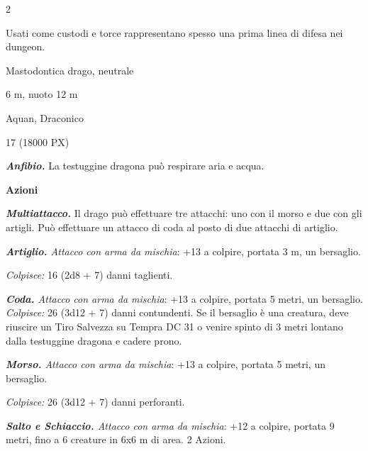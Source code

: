\begin{multicols}{2}
{Usati come custodi e torce rappresentano spesso una prima linea di difesa nei dungeon.

\begin{description}[noitemsep, topsep=0pt, parsep=0pt, partopsep=0pt, itemsep=1pt, leftmargin=2.35cm,  labelwidth=2.2cm, itemindent=0cm, listparindent=0pt] %
\setlength{\baselineskip}{10pt}
\item[\textbf{Taglia/Tipo}] Mastodontica drago, neutrale
\item[\textbf{Caratt.}] 
\item[\textbf{Punti Ferita}] 
\item[\textbf{Movimento}] 6 m, nuoto 12 m
\item[\textbf{Tiri Salvez.}] 
\item[\textbf{Sensi}] 
\item[\textbf{Linguaggi}] Aquan, Draconico
\item[\textbf{Sfida}] 17 (18000 PX)
\end{description}
\smallskip

\emph{\textbf{Anfibio.}} La testuggine dragona può respirare aria e acqua.

\textbf{Azioni}

\emph{\textbf{Multiattacco.}} Il drago può effettuare tre attacchi: uno con il morso e due con gli artigli. Può effettuare un attacco di coda al posto di due attacchi di artiglio.

\emph{\textbf{Artiglio.} Attacco con arma da mischia}: +13 a colpire, portata 3 m, un bersaglio.

\emph{Colpisce:} 16 (2d8 + 7) danni taglienti.

\emph{\textbf{Coda.} Attacco con arma da mischia}: +13 a colpire, portata 5 metri, un bersaglio.
\emph{Colpisce:} 26 (3d12 + 7) danni contundenti. Se il bersaglio è una creatura, deve riuscire un Tiro Salvezza su Tempra DC 31 o venire spinto di 3 metri lontano dalla testuggine dragona e cadere prono.

\emph{\textbf{Morso.} Attacco con arma da mischia}: +13 a colpire, portata 5 metri, un bersaglio.

\emph{Colpisce:} 26 (3d12 + 7) danni perforanti.

\emph{\textbf{Salto e Schiaccio.} Attacco con arma da mischia}: +12 a colpire, portata 9 metri, fino a 6 creature in 6x6 m di area. 2 Azioni.

}
\end{multicols}
